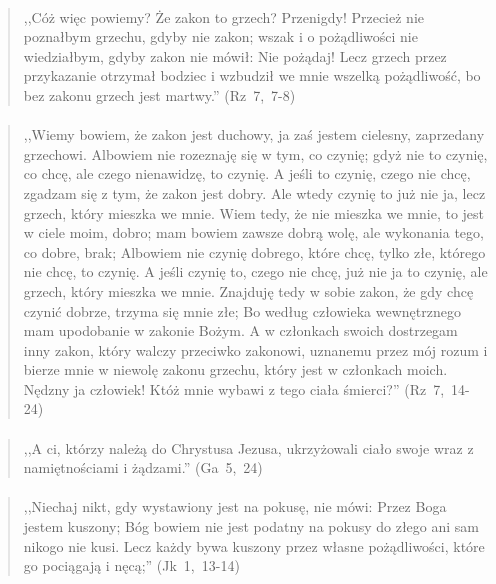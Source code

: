 \documentclass[10pt,a4paper,oneside]{article}
\begin{document}
\paragraph{}
\begin{quote}
,,Cóż więc powiemy? Że zakon to grzech? Przenigdy! Przecież nie poznałbym grzechu, gdyby nie zakon; wszak i o pożądliwości nie wiedziałbym, gdyby zakon nie mówił: Nie pożądaj! Lecz grzech przez przykazanie otrzymał bodziec i wzbudził we mnie wszelką pożądliwość, bo bez zakonu grzech jest martwy.'' \mbox{(Rz 7, 7-8)}
\end{quote}
\paragraph{}
\begin{quote}
,,Wiemy bowiem, że zakon jest duchowy, ja zaś jestem cielesny, zaprzedany grzechowi. Albowiem nie rozeznaję się w tym, co czynię; gdyż nie to czynię, co chcę, ale czego nienawidzę, to czynię. A jeśli to czynię, czego nie chcę, zgadzam się z tym, że zakon jest dobry. Ale wtedy czynię to już nie ja, lecz grzech, który mieszka we mnie. Wiem tedy, że nie mieszka we mnie, to jest w ciele moim, dobro; mam bowiem zawsze dobrą wolę, ale wykonania tego, co dobre, brak; Albowiem nie czynię dobrego, które chcę, tylko złe, którego nie chcę, to czynię. A jeśli czynię to, czego nie chcę, już nie ja to czynię, ale grzech, który mieszka we mnie. Znajduję tedy w sobie zakon, że gdy chcę czynić dobrze, trzyma się mnie złe; Bo według człowieka wewnętrznego mam upodobanie w zakonie Bożym. A w członkach swoich dostrzegam inny zakon, który walczy przeciwko zakonowi, uznanemu przez mój rozum i bierze mnie w niewolę zakonu grzechu, który jest w członkach moich. Nędzny ja człowiek! Któż mnie wybawi z tego ciała śmierci?'' \mbox{(Rz 7, 14-24)}
\end{quote}
\paragraph{}
\begin{quote}
,,A ci, którzy należą do Chrystusa Jezusa, ukrzyżowali ciało swoje wraz z namiętnościami i żądzami.'' \mbox{(Ga 5, 24)}
\end{quote}
\paragraph{}
\begin{quote}
,,Niechaj nikt, gdy wystawiony jest na pokusę, nie mówi: Przez Boga jestem kuszony; Bóg bowiem nie jest podatny na pokusy do złego ani sam nikogo nie kusi. Lecz każdy bywa kuszony przez własne pożądliwości, które go pociągają i nęcą;'' \mbox{(Jk 1, 13-14)}
\end{quote}
\end{document}
